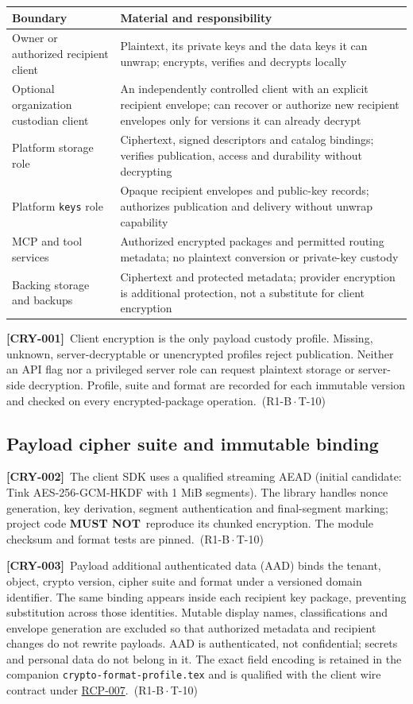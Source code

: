 \documentclass[11pt,a4paper]{article}
\newcommand{\mustnot}{\textbf{MUST NOT}}
\newcommand{\code}[1]{{\small\nolinkurl{#1}}}
\newcommand{\rr}[1]{\hyperlink{req:#1}{#1}}
\newcommand{\reqtag}[2]{{\footnotesize\color{accent}(#1\,$\cdot$\,#2)}}
\newcommand{\req}[4]{\par\noindent\hypertarget{req:#1}{\textbf{[#1]}}\ #4\ \reqtag{#2}{#3}\par}
\begin{document}
\begin{longtable}{@{}P{0.27\textwidth}P{0.63\textwidth}@{}}
\toprule Boundary & Material and responsibility\\\midrule\endhead
Owner or authorized recipient client & Plaintext, its private keys and the data keys it can unwrap; encrypts, verifies and decrypts locally\\
Optional organization custodian client & An independently controlled client with an explicit recipient envelope; can recover or authorize new recipient envelopes only for versions it can already decrypt\\
Platform storage role & Ciphertext, signed descriptors and catalog bindings; verifies publication, access and durability without decrypting\\
Platform \code{keys} role & Opaque recipient envelopes and public-key records; authorizes publication and delivery without unwrap capability\\
MCP and tool services & Authorized encrypted packages and permitted routing metadata; no plaintext conversion or private-key custody\\
Backing storage and backups & Ciphertext and protected metadata; provider encryption is additional protection, not a substitute for client encryption\\
\bottomrule
\end{longtable}
\req{CRY-001}{R1-B}{T-10}{Client encryption is the only payload custody profile. Missing, unknown, server-decryptable or unencrypted profiles reject publication. Neither an API flag nor a privileged server role can request plaintext storage or server-side decryption. Profile, suite and format are recorded for each immutable version and checked on every encrypted-package operation.}

\subsection{Payload cipher suite and immutable binding}
\req{CRY-002}{R1-B}{T-10}{The client SDK uses a qualified streaming AEAD (initial candidate: Tink AES-256-GCM-HKDF with 1 MiB segments). The library handles nonce generation, key derivation, segment authentication and final-segment marking; project code \mustnot\ reproduce its chunked encryption. The module checksum and format tests are pinned.}
\req{CRY-003}{R1-B}{T-10}{Payload additional authenticated data (AAD) binds the tenant, object, crypto version, cipher suite and format under a versioned domain identifier. The same binding appears inside each recipient key package, preventing substitution across those identities. Mutable display names, classifications and envelope generation are excluded so that authorized metadata and recipient changes do not rewrite payloads. AAD is authenticated, not confidential; secrets and personal data do not belong in it. The exact field encoding is retained in the companion \code{crypto-format-profile.tex} and is qualified with the client wire contract under \rr{RCP-007}.}
\end{document}
